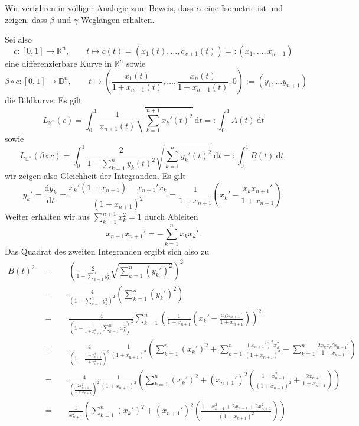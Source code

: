 \documentclass[11pt]{book}
\numberwithin{dummy}{section}
\theoremstyle{nonumberbreak}
\newenvironment{prob}[1][]{\ifthenelse{\equal{#1}{}}{\problem}{\problem[#1]}\rm}{\endproblem}
\newenvironment{sol}[1][]{\ifthenelse{\equal{#1}{}}{\solution}{\solution[#1]}\rm}{\endsolution}
\newcommand{\Loid}{\mathbb{L}}
\newcommand{\D}{\mathbb{D}}
\newcommand{\la}{\longrightarrow}
\begin{document}
\begin{spacing}{1.4}
\begin{prob}
\begin{sol}
Wir verfahren in völliger Analogie zum Beweis, dass $\alpha$ eine Isometrie ist und zeigen, dass $\beta$ und $\gamma$ Weglängen erhalten.
\begin{compactenum}
\item Sei also
$$c:[0,1] \la \mathbb{K}^n, \qquad t \mapsto c(t)=\left(x_1(t), \ldots, c_{x+1}(t)\right)=: (x_1, \ldots, x_{n+1})$$
eine differenzierbare Kurve in $\mathbb{K}^n$ sowie $$\beta \circ c: [0,1] \la \D^n, \qquad t \mapsto \left(\frac{x_1(t)}{1+x_{n+1}(t)}, \ldots, \frac{x_n(t)}{1+x_{n+1}(t)}, 0\right) := (y_1,\ldots  y_{n+1})$$ die Bildkurve. Es gilt
$$L_{\mathbb{K}^n}(c)= \int_0^1 \frac{1}{x_{n+1}(t)} \sqrt{\sum_{k=1}^{n+1} x_k'(t)^2} \ \mathrm{d}t =: \int_0^1 A(t) \ \mathrm{d}t$$
sowie 
$$L_{\Loid^n}(\beta \circ c) = \int_0^1 \frac{2}{1-\sum_{k=1}^n y_k(t)^2} \sqrt{\sum_{k=1}^n y_k'(t)^2} \ \mathrm{d}t=: \int_0^1 B(t) \ \mathrm{d}t,$$
wir zeigen also Gleichheit der Integranden. Es gilt 
$$y_k' = \frac{\mathrm{d}y_k}{\mathrm{d}t} = \frac{x_k'(1+x_{n+1}) - x_{n+1}' x_k}{(1+x_{n+1})^2} = \frac{1}{1+x_{n+1}} \left( x_k' - \frac{x_kx_{n+1}'}{1+x_{n+1}}\right).$$
Weiter erhalten wir aus $\sum_{k=1}^{n+1} x_k^2 =1$ durch Ableiten
$$x_{n+1} x_{n+1}' = - \sum_{k=1}^n x_k x_k'.$$
Das Quadrat des zweiten Integranden ergibt sich also zu 
\begin{alignat*}{5}
B(t)^2 \ \ &=&& \ \ \left( \frac{2}{1-\sum_{k=1}^n y_k^2} \sqrt{\sum_{k=1}^n (y_k')^2}\right)^2 \\
&=&& \ \ \frac{4}{\left( 1- \sum_{k=1}^n y_k^2\right)^2} \left( \sum_{k=1}^n (y_k')^2\right) \\
&=&& \ \ \frac{4}{\left( 1- \frac{1}{1+x_{n+1}^2} \sum_{k=1}^n x_k^2\right)^2} \sum_{k=1}^n \left( \frac{1}{1+x_{n+1}} \left( x_k' - \frac{x_kx_{n+1}'}{1+x_{n+1}}\right) \right)^2 \\
&=&& \ \ \frac{4}{\left( 1- \frac{1-x_{n+1}^2}{1+x_{n+1}^2}\right)^2} \frac{1}{(1+x_{n+1})^2} \left( \sum_{k=1}^n (x_k')^2 + \sum_{k=1}^n \frac{(x_{n+1}')^2x_k^2}{(1+x_{n+1})^2} - \sum_{k=1}^n \frac{2x_kx_k'x_{n+1}'}{1+x_{n+1}} \right)\\
&=&& \ \ \frac{4}{\left( \frac{2 x_{n+1}^2}{1+x_{n+1}}\right)^2} \frac{1}{(1+x_{n+1})^2} \left( \sum_{k=1}^n (x_k')^2 + (x_{n+1}')^2 \left( \frac{1-x_{n+1}^2}{(1+x_{n+1})^2} + \frac{2x_{n+1}}{1+x_{n+1}}\right) \right) \\
&=&& \ \ \frac{1}{x_{n+1}^2} \left( \sum_{k=1}^n (x_k')^2 + (x_{n+1}')^2 \left( \frac{1-x_{n+1}^2 + 2 x_{n+1} + 2 x_{n+1}^2}{(1+x_{n+1})^2} \right) \right) \\

\end{alignat*}
\end{compactenum}
\end{sol}
\end{prob}
\end{spacing}
\end{document}
